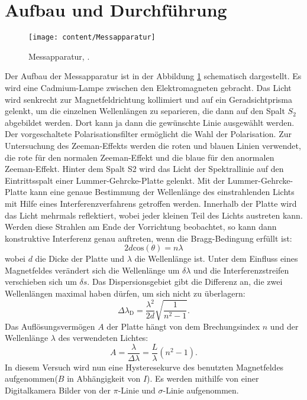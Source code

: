 \section{Aufbau und Durchführung}
\label{sec:AufbauundDurchführung}
\begin{figure}[h!]
	\centering
	\texttt{[image: content/Messapparatur]}
	\caption{Messapparatur, \cite[12]{anleitungV27}.}
	\label{fig:messapparatur}
\end{figure}
Der Aufbau der Messapparatur ist in der Abbildung \ref{fig:messapparatur} schematisch dargestellt. Es wird eine Cadmium-Lampe zwischen den Elektromagneten gebracht. Das Licht wird senkrecht zur Magnetfeldrichtung kollimiert und auf ein Geradsichtprisma gelenkt, um die einzelnen Wellenlängen zu separieren, die dann auf den Spalt $S_2$ abgebildet werden. Dort kann ja dann die gewünschte Linie ausgewählt werden. Der vorgeschaltete Polarisationsfilter ermöglicht die Wahl der Polarisation. Zur Untersuchung des Zeeman-Effekts werden die roten und blauen Linien verwendet, die rote für den normalen Zeeman-Effekt und die blaue für den anormalen Zeeman-Effekt. Hinter dem Spalt S2 wird das Licht der Spektrallinie auf den Eintrittsspalt einer Lummer-Gehrcke-Platte gelenkt.
Mit der Lummer-Gehrcke-Platte kann eine genaue Bestimmung der Wellenlänge des einstrahlenden Lichts mit Hilfe eines Interferenzverfahrens getroffen werden. Innerhalb der Platte wird das Licht mehrmals reflektiert, wobei jeder kleinen Teil des Lichts austreten kann. Werden diese Strahlen am Ende der Vorrichtung beobachtet, so kann dann konstruktive Interferenz genau auftreten, wenn die Bragg-Bedingung erfüllt ist:
\begin{equation}
2d\text{cos}(\theta) = n\lambda
\end{equation}
wobei $d$ die Dicke der Platte und $\lambda$ die Wellenlänge ist. Unter dem Einfluss eines Magnetfeldes verändert sich die Wellenlänge um $\delta\lambda$ und die Interferenzstreifen verschieben sich um $\delta s$.
Das Dispersionsgebiet gibt die Differenz an, die zwei Wellenlängen maximal haben dürfen, um sich nicht zu überlagern:
\begin{equation}
\label{eq:dispersionsgebiet}
\Delta \lambda_\text{D} = \frac{\lambda^2}{2d} \sqrt{\frac{1}{n^2-1}}.
\end{equation}
Das Auflösungsvermögen $A$ der Platte hängt von dem Brechungsindex $n$ und  der Wellenlänge $\lambda$ des verwendeten Lichtes:
\begin{equation}
\label{eq:auflösungsvermögen}
A = \frac{\lambda}{\Delta\lambda} = \frac{L}{\lambda}(n^2-1).
\end{equation}
In diesem Versuch wird nun eine Hysteresekurve des benutzten Magnetfeldes aufgenommen($B$ in Abhängigkeit von $I$). Es werden mithilfe von einer Digitalkamera Bilder von der $\pi$-Linie und $\sigma$-Linie aufgenommen.